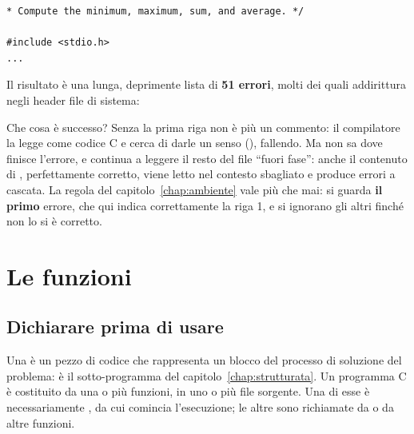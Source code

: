 \begin{lstlisting}[style=c, name=running_sum2Errore.c]
* Compute the minimum, maximum, sum, and average. */

#include <stdio.h>
...
\end{lstlisting}

Il risultato è una lunga, deprimente lista di \textbf{51 errori}, molti dei
quali addirittura negli header file di sistema:


Che cosa è successo? Senza \code{/*} la prima riga non è più un commento: il
compilatore la legge come codice C e cerca di darle un senso
(), fallendo. Ma non sa dove finisce l'errore, e
continua a leggere il resto del file “fuori fase”: anche il contenuto di
, perfettamente corretto, viene letto nel contesto sbagliato e
produce errori a cascata. La regola del capitolo~\ref{chap:ambiente} vale
più che mai: si guarda \textbf{il primo} errore, che qui indica
correttamente la riga 1, e si ignorano gli altri finché non lo si è
corretto.


\section{Le funzioni}

\subsection{Dichiarare prima di usare}

Una  è un pezzo di codice che rappresenta un blocco del
processo di soluzione del problema: è il sotto-programma del
capitolo~\ref{chap:strutturata}. Un programma C è costituito da una o più
funzioni, in uno o più file sorgente. Una di esse è necessariamente
, da cui comincia l'esecuzione; le altre sono richiamate da
 o da altre funzioni.

